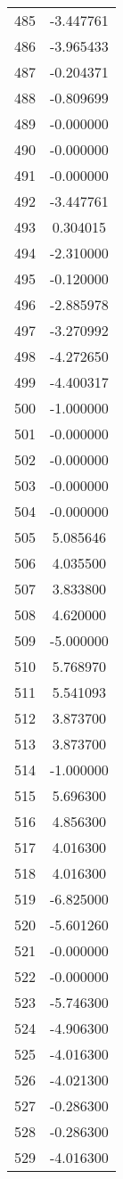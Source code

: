 \documentclass[12pt]{article}
\begin{document}
\begin{longtable}{@{}cc@{}}
485 & -3.447761 \\
486 & -3.965433 \\
487 & -0.204371 \\
488 & -0.809699 \\
489 & -0.000000 \\
490 & -0.000000 \\
491 & -0.000000 \\
492 & -3.447761 \\
493 & 0.304015 \\
494 & -2.310000 \\
495 & -0.120000 \\
496 & -2.885978 \\
497 & -3.270992 \\
498 & -4.272650 \\
499 & -4.400317 \\
500 & -1.000000 \\
501 & -0.000000 \\
502 & -0.000000 \\
503 & -0.000000 \\
504 & -0.000000 \\
505 & 5.085646 \\
506 & 4.035500 \\
507 & 3.833800 \\
508 & 4.620000 \\
509 & -5.000000 \\
510 & 5.768970 \\
511 & 5.541093 \\
512 & 3.873700 \\
513 & 3.873700 \\
514 & -1.000000 \\
515 & 5.696300 \\
516 & 4.856300 \\
517 & 4.016300 \\
518 & 4.016300 \\
519 & -6.825000 \\
520 & -5.601260 \\
521 & -0.000000 \\
522 & -0.000000 \\
523 & -5.746300 \\
524 & -4.906300 \\
525 & -4.016300 \\
526 & -4.021300 \\
527 & -0.286300 \\
528 & -0.286300 \\
529 & -4.016300 \\

\end{longtable}
\end{document}

